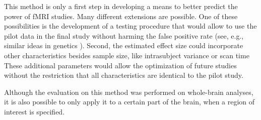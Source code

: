 
This method is only a first step in developing a means to better predict the power of fMRI studies.  Many different extensions are possible.  One of these possibilities is the development of a testing procedure that would allow to use the pilot data in the final study without harming the false positive rate (see, e.g., similar ideas in genetics \citealt{Skol2006}).  Second, the estimated effect size could incorporate other characteristics besides sample size, like intrasubject variance or scan time \citep{Mumford2008}  These additional parameters would allow the optimization of future studies without the restriction that all characteristics are identical to the pilot study.

Although the evaluation on this method was performed on whole-brain analyses, it is also possible to only apply it to a certain part of the brain, when a region of interest is specified.

